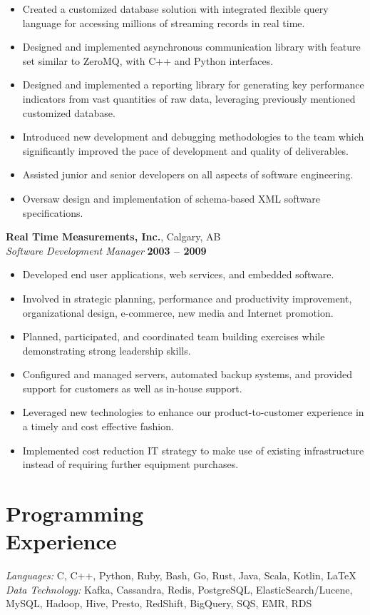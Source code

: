 \documentclass[margin,line]{resume}
\begin{document}
\begin{resume}
    \begin{itemize}
    \item Created a customized database solution with integrated flexible query language for accessing millions of streaming records in real time.
    \item Designed and implemented asynchronous communication library with feature set similar to ZeroMQ, with C++ and Python interfaces.
    \item Designed and implemented a reporting library for generating key performance indicators from vast quantities of raw data, leveraging previously mentioned customized database.
    \item Introduced new development and debugging methodologies to the team which significantly improved the pace of development and quality of deliverables.
    \item Assisted junior and senior developers on all aspects of software engineering.
    \item Oversaw design and implementation of schema-based XML software specifications.
    \end{itemize}

    \textbf{Real Time Measurements, Inc.}, Calgary, AB \vspace{2mm}\\\vspace{1mm}%
    \textsl{Software Development Manager} \hfill \textbf{2003 -- 2009}\\

    \begin{itemize}
    \item Developed end user applications, web services, and embedded software.
    \item Involved in strategic planning, performance and productivity improvement, organizational design, e-commerce, new media and Internet promotion.
    \item Planned, participated, and coordinated team building exercises while demonstrating strong leadership skills.
    \item Configured and managed servers, automated backup systems, and provided support for customers as well as in-house support.
    \item Leveraged new technologies to enhance our product-to-customer experience in a timely and cost effective fashion.
    \item Implemented cost reduction IT strategy to make use of existing infrastructure instead of requiring further equipment purchases.
    \end{itemize}

    \section{\mysidestyle Programming\\Experience}

    \emph{Languages:} C, C++, Python, Ruby, Bash, Go, Rust, Java, Scala, Kotlin, \LaTeX \\
    \emph{Data Technology:} Kafka, Cassandra, Redis, PostgreSQL, ElasticSearch/Lucene,
     MySQL, Hadoop, Hive, Presto, RedShift, BigQuery, SQS, EMR, RDS

\end{resume}
\end{document}
